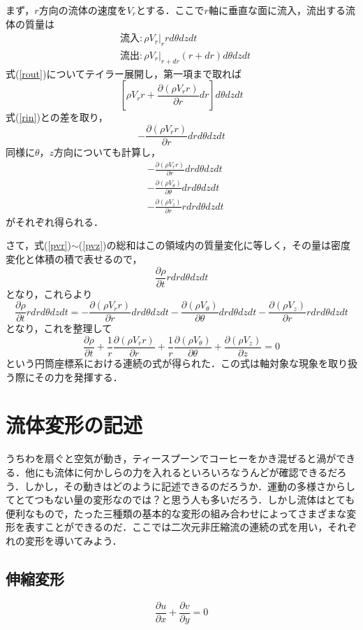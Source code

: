 \documentclass{jsarticle}
\newcommand{\pfrac}[2]{\frac{\partial{}{#1}}{\partial{}{#2}}}
\begin{document}
まず，$r$方向の流体の速度を$V_r$とする．ここで$r$軸に垂直な面に流入，流出する流体の質量は
\begin{align}
  &流入: \rho{}V_r|_{r}rd\theta{}dzdt\label{rin}\\
  &流出: \rho{}V_r|_{r+dr}(r+dr)d\theta{}dzdt\label{rout}
\end{align}
式(\ref{rout})についてテイラー展開し，第一項まで取れば
\begin{equation}
  \left[\rho{}V_rr+\pfrac{(\rho{}V_rr)}{r}dr\right]d\theta{}dzdt
\end{equation}
式(\ref{rin})との差を取り，
\begin{equation}
  -\pfrac{(\rho{}V_rr)}{r}drd\theta{}dzdt
\end{equation}
同様に$\theta{}$，$z$方向についても計算し，
\begin{align}
  &-\pfrac{(\rho{}V_rr)}{r}drd\theta{}dzdt\label{pvr}\\
  &-\pfrac{(\rho{}V_\theta{})}{\theta{}}drd\theta{}dzdt\label{pvtheta}\\
  &-\pfrac{(\rho{}V_z)}{r}rdrd\theta{}dzdt\label{pvz}
\end{align}
がそれぞれ得られる．

さて，式(\ref{pvr})$\sim$(\ref{pvz})の総和はこの領域内の質量変化に等しく，その量は密度変化と体積の積で表せるので，
\begin{equation}
  \pfrac{\rho{}}{t}rdrd\theta{}dzdt
\end{equation}
となり，これらより
\begin{equation}
  \pfrac{\rho{}}{t}rdrd\theta{}dzdt=-\pfrac{(\rho{}V_rr)}{r}drd\theta{}dzdt-\pfrac{(\rho{}V_\theta{})}{\theta{}}drd\theta{}dzdt-\pfrac{(\rho{}V_z)}{r}rdrd\theta{}dzdt
\end{equation}
となり，これを整理して
\begin{equation}
  \pfrac{\rho{}}{t}+\frac{1}{r}\pfrac{(\rho{}V_rr)}{r}+\frac{1}{r}\pfrac{(\rho{}V_\theta{})}{\theta{}}+\pfrac{(\rho{}V_z)}{z}=0
\end{equation}
という円筒座標系における連続の式が得られた．この式は軸対象な現象を取り扱う際にその力を発揮する．

\section{流体変形の記述}
うちわを扇ぐと空気が動き，ティースプーンでコーヒーをかき混ぜると渦ができる．他にも流体に何かしらの力を入れるといろいろなうんどが確認できるだろう．しかし，その動きはどのように記述できるのだろうか．運動の多様さからしてとてつもない量の変形なのでは？と思う人も多いだろう．しかし流体はとても便利なもので，たった三種類の基本的な変形の組み合わせによってさまざまな変形を表すことができるのだ．ここでは二次元非圧縮流の連続の式を用い，それぞれの変形を導いてみよう．
\subsection{伸縮変形}
\begin{equation}
  \pfrac{u}{x}+\pfrac{v}{y}=0
\end{equation}
\end{document}
